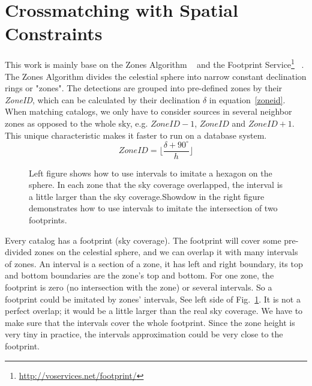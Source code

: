 \section{Crossmatching with Spatial Constraints}
This work is mainly base on the Zones Algorithm ~\citep{DBLP:journals/corr/abs-cs-0701171} and the Footprint Service\footnote{\url{http://voservices.net/footprint/}} ~\citep{2007ASPC..376..559B}. The Zones Algorithm divides the celestial sphere into narrow constant declination rings or "zones". The detections are grouped into pre-defined zones by their \textit{ZoneID}, which can be calculated by their declination $\delta$ in equation~\ref{zoneid}. When matching catalogs, we only have to consider sources in several neighbor zones as opposed to the whole sky, e.g. $ZoneID-1$, $ZoneID$ and $ZoneID+1$. This unique characteristic makes it faster to run on a database system.
\begin{equation}\label{zoneid}
ZoneID=\lfloor{\frac{\delta + 90^\circ}{h}}\rfloor
\end{equation}

\begin{figure}
\begin{center}
\caption{{Left figure shows how to use intervals to imitate a hexagon on the sphere. In each zone that the sky coverage overlapped, the interval is a little larger than the sky coverage.}{Showdow in the right figure demonstrates how to use intervals to imitate the intersection of two footprints.}\label{P046_f2}}
\end{center}
\end{figure}

Every catalog has a footprint (sky coverage). The footprint will cover some pre-divided zones on the celestial sphere, and we can overlap it with many intervals of zones. An interval is a section of a zone, it has left and right boundary, its top and bottom boundaries are the zone's top and bottom. For one zone, the footprint is zero (no intersection with the zone) or several intervals. So a footprint could be imitated by zones' intervals, See left side of Fig.~\ref{P046_f2}. It is not a perfect overlap; it would be a little larger than the real sky coverage. We have to make sure that the intervals cover the whole footprint. Since the zone height is very tiny in practice, the intervals approximation could be very close to the footprint.

